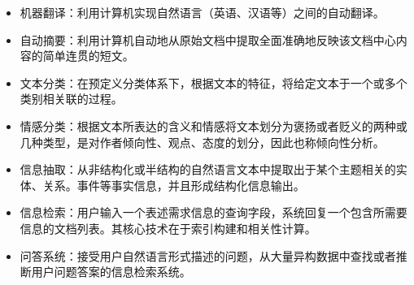 \begin{itemize}
\item 机器翻译：利用计算机实现自然语言（英语、汉语等）之间的自动翻译。
\item 自动摘要：利用计算机自动地从原始文档中提取全面准确地反映该文档中心内容的简单连贯的短文。
\item 文本分类：在预定义分类体系下，根据文本的特征，将给定文本于一个或多个类别相关联的过程。
\item 情感分类：根据文本所表达的含义和情感将文本划分为褒扬或者贬义的两种或几种类型，是对作者倾向性、观点、态度的划分，因此也称倾向性分析。
\item 信息抽取：从非结构化或半结构的自然语言文本中提取出于某个主题相关的实体、关系。事件等事实信息，并且形成结构化信息输出。
\item 信息检索：用户输入一个表述需求信息的查询字段，系统回复一个包含所需要信息的文档列表。其核心技术在于索引构建和相关性计算。
\item 问答系统：接受用户自然语言形式描述的问题，从大量异构数据中查找或者推断用户问题答案的信息检索系统。
\end{itemize}
